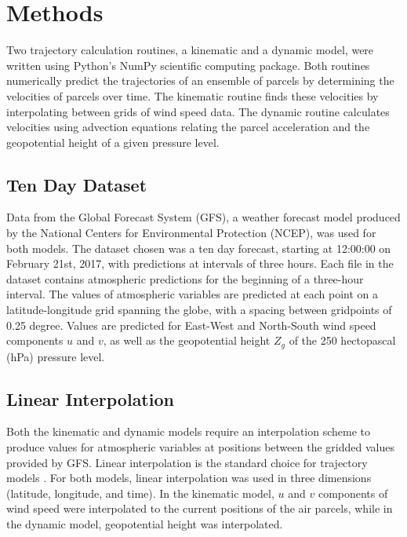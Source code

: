 \chapter{Methods}

Two trajectory calculation routines, a kinematic and a dynamic model, were written using Python's NumPy scientific computing package.
Both routines numerically predict the trajectories of an ensemble of parcels by determining the velocities of parcels over time. 
The kinematic routine finds these velocities by interpolating between grids of wind speed data. 
The dynamic routine calculates velocities using advection equations relating the parcel acceleration and the geopotential height of a given pressure level. 

\section{Ten Day Dataset}
Data from the Global Forecast System (GFS), a weather forecast model produced by the National Centers for Environmental Protection (NCEP), was used for both models.
The dataset chosen was a ten day forecast, starting at 12:00:00 on February 21st, 2017, with predictions at intervals of three hours.
Each file in the dataset contains atmospheric predictions for the beginning of a three-hour interval. 
The values of atmospheric variables are predicted at each point on a latitude-longitude grid spanning the globe, with a spacing between gridpoints of 0.25 degree.
Values are predicted for East-West and North-South wind speed components $u$ and $v$, as well as the geopotential height $Z_g$ of the 250 hectopascal (hPa) pressure level.

\section{Linear Interpolation}
Both the kinematic and dynamic models require an interpolation scheme to produce values for atmospheric variables at positions between the gridded values provided by GFS. 
Linear interpolation is the standard choice for trajectory models \cite{bowman_input_2013}. 
For both models, linear interpolation was used in three dimensions (latitude, longitude, and time). 
In the kinematic model, $u$ and $v$ components of wind speed were interpolated to the current positions of the air parcels, while in the dynamic model, geopotential height was interpolated.

